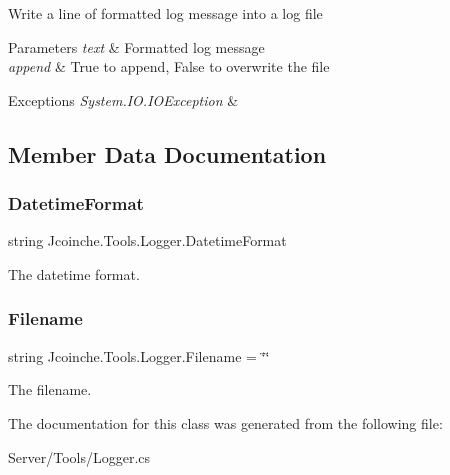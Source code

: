 Write a line of formatted log message into a log file 


\begin{DoxyParams}{Parameters}
{\em text} & Formatted log message\\
\hline
{\em append} & True to append, False to overwrite the file\\
\hline
\end{DoxyParams}

\begin{DoxyExceptions}{Exceptions}
{\em System.\+I\+O.\+I\+O\+Exception} & \\
\hline
\end{DoxyExceptions}


\subsection{Member Data Documentation}
\mbox{\label{class_jcoinche_1_1_tools_1_1_logger_a16490a5d7215f66a933bd360242e1a30}} 
\subsubsection{\texorpdfstring{Datetime\+Format}{DatetimeFormat}}
{\footnotesize\ttfamily string Jcoinche.\+Tools.\+Logger.\+Datetime\+Format\hspace{0.3cm}{\ttfamily [private]}}



The datetime format. 

\mbox{\label{class_jcoinche_1_1_tools_1_1_logger_ac62c61b52dd90826b0bc03bf2ab6823d}} 
\subsubsection{\texorpdfstring{Filename}{Filename}}
{\footnotesize\ttfamily string Jcoinche.\+Tools.\+Logger.\+Filename = \char`\"{}\char`\"{}\hspace{0.3cm}{\ttfamily [private]}}



The filename. 



The documentation for this class was generated from the following file\+:\begin{DoxyCompactItemize}
\item 
Server/\+Tools/Logger.\+cs\end{DoxyCompactItemize}
